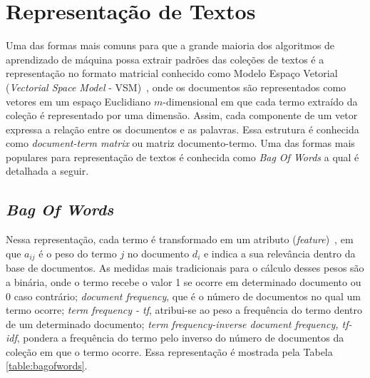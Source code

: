 \section{Representação de Textos} \label{section:RepTextos}


Uma das formas mais comuns para que a grande maioria dos algoritmos de aprendizado de máquina possa extrair padrões das coleções de textos é a representação no formato matricial conhecido como Modelo Espaço Vetorial (\textit{Vectorial Space Model} - VSM)~\cite{Rezende2003}, onde os documentos são representados como vetores em um espaço Euclidiano $m$-dimensional em que cada termo extraído da coleção é representado por uma dimensão. Assim, cada componente de um vetor expressa a relação entre os documentos e as palavras. Essa estrutura é conhecida como \textit{document-term matrix} ou matriz documento-termo. Uma das formas mais populares para representação de textos é conhecida como \textit{Bag Of Words} a qual é detalhada a seguir.
	

\subsection{\textit{Bag Of Words}} \label{subsubsec:BOW}
		
Nessa representação, cada termo é transformado em um atributo  (\textit{feature})~\cite{Rezende2003}, em que $a_{ij}$ é o peso do termo $j$ no documento $d_i$ e indica a sua relevância dentro da base de documentos. As medidas mais tradicionais para o cálculo desses pesos são a binária, onde o termo recebe o valor 1 se ocorre em determinado documento ou 0 caso contrário; \textit{document frequency}, que é o número de documentos no qual um termo ocorre; \textit{term frequency - tf}, atribui-se ao peso a frequência do termo dentro de um determinado documento; \textit{term frequency-inverse document frequency, tf-idf}, pondera a frequência do termo pelo inverso do número de documentos da coleção em que o termo ocorre.
Essa representação é mostrada pela Tabela \ref{table:bagofwords}.

